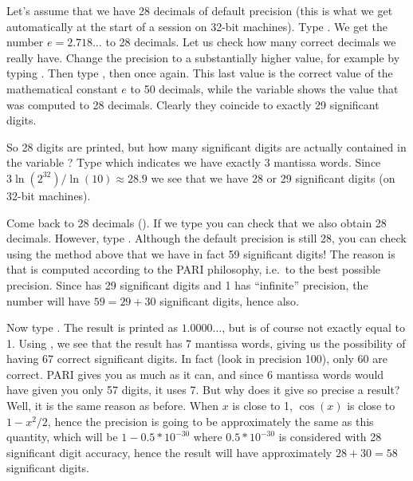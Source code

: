 Let's assume that we have 28 decimals of default precision (this is what we
get automatically at the start of a  session on 32-bit machines). Type
. We get the number $e=2.718\dots$ to 28 decimals. Let us check
how many correct decimals we really have. Change the precision to a
substantially higher value, for example by typing . Then type
, then  once again. This last value is the correct value
of the mathematical constant $e$ to 50 decimals, while the variable 
shows the value that was computed to 28 decimals. Clearly they coincide to
exactly 29 significant digits.

So 28 digits are printed, but how many significant digits are actually
contained in the variable ? Type  which indicates we have
exactly $3$ mantissa words. Since $3\ln(2^{32}) / \ln(10)\approx28.9$ we see
that we have 28 or 29 significant digits (on 32-bit machines).

\smallskip
Come back to 28 decimals (). If we type 
you can check that we also obtain 28 decimals. However, type
. Although the default precision is still 28,
you can check using the method above that we have in fact 59 significant
digits! The reason is that  is computed according to the PARI
philosophy, i.e.~to the best possible precision. Since  has 29
significant digits and 1 has ``infinite'' precision, the number  will have $59=29+30$ significant digits, hence  also.

Now type . The result is printed as $1.0000\dots$, but
is of course not exactly equal to 1. Using \kbd{\#\%}, we see that the
result has 7 mantissa words, giving us the possibility of having 67
correct significant digits. In fact (look in precision 100), only 60 are
correct. PARI gives you as much as it can, and since 6 mantissa words
would have given you only 57 digits, it uses 7. But why does it give so
precise a result? Well, it is the same reason as before. When $x$ is close
to 1, $\cos(x)$ is close to $1-x^2/2$, hence the precision is going to be
approximately the same as this quantity, which will be $1-0.5*10^{-30}$ where
$0.5*10^{-30}$ is considered with 28 significant digit accuracy, hence the
result will have approximately $28+30=58$ significant digits.

